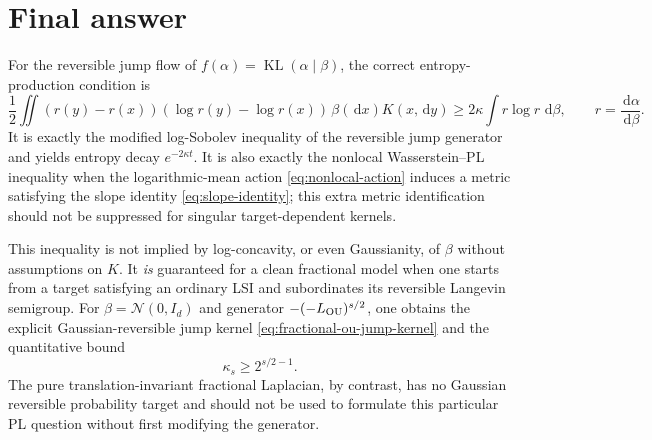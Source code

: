 \documentclass[11pt]{article}
\theoremstyle{definition}
\DeclareMathOperator{\KL}{KL}
\newcommand{\dd}{\,\mathrm d}
\begin{document}
\section{Final answer}

For the reversible jump flow of
$f(\alpha)=\KL(\alpha\mid\beta)$, the correct entropy-production condition is
\[
  \boxed{
  \frac12\iint
  (r(y)-r(x))(\log r(y)-\log r(x))
  \,\beta(\dd x)K(x,\dd y)
  \geq2\kappa\int r\log r\,\dd\beta,
  \qquad r=\frac{\dd\alpha}{\dd\beta}.}
\]
It is exactly the modified log-Sobolev inequality of the reversible jump
generator and yields entropy decay $e^{-2\kappa t}$.  It is also exactly the
nonlocal Wasserstein--PL inequality when the logarithmic-mean action
\eqref{eq:nonlocal-action} induces a metric satisfying the slope identity
\eqref{eq:slope-identity}; this extra metric identification should not be
suppressed for singular target-dependent kernels.

This inequality is not implied by log-concavity, or even Gaussianity, of
$\beta$ without assumptions on $K$.  It \emph{is} guaranteed for a clean
fractional model when one starts from a target satisfying an ordinary LSI and
subordinates its reversible Langevin semigroup.  For
$\beta=\mathcal N(0,I_d)$ and generator
$-(-L_{\rm OU})^{s/2}$, one obtains the explicit Gaussian-reversible jump
kernel \eqref{eq:fractional-ou-jump-kernel} and the quantitative bound
\[
  \boxed{\kappa_s\geq2^{s/2-1}.}
\]
The pure translation-invariant fractional Laplacian, by contrast, has no
Gaussian reversible probability target and should not be used to formulate
this particular PL question without first modifying the generator.



\end{document}
